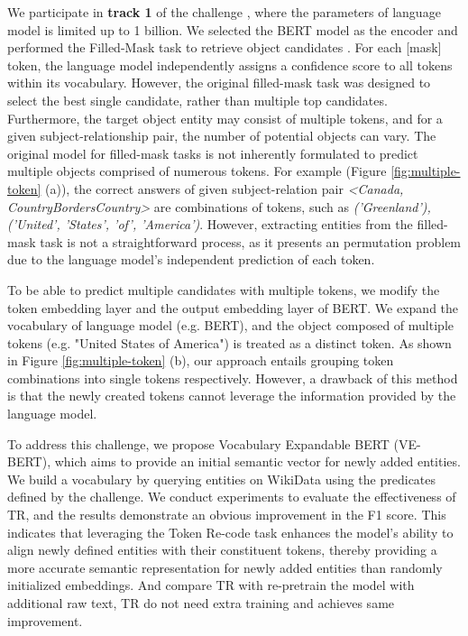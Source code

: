 \documentclass[]{ceurart}
\begin{document}
We participate in \textbf{track 1} of the challenge \cite{singhania_lm-kbc_2023}, where the parameters of language model is limited up to 1 billion.  We selected the BERT \cite{devlin_bert_2019} model as the encoder and performed the Filled-Mask task to retrieve object candidates \cite{li_task-specific_2022}. For each [mask] token, the language model independently assigns a confidence score to all tokens within its vocabulary. However, the original filled-mask task was designed to select the best single candidate, rather than multiple top candidates. Furthermore, the target object entity may consist of multiple tokens, and for a given subject-relationship pair, the number of potential objects can vary. The original model for filled-mask tasks is not inherently formulated to predict multiple objects comprised of numerous tokens. For example (Figure \ref{fig:multiple-token} (a)),  the correct answers of given subject-relation pair \textit{<Canada, CountryBordersCountry>} are combinations of tokens, such as \textit{('Greenland'), ('United', 'States', 'of', 'America')}. However, extracting entities from the filled-mask task is not a straightforward process, as it presents an permutation problem due to the language model's independent prediction of each token.

To be able to predict multiple candidates with multiple tokens, we modify the token embedding layer and the output embedding layer of BERT. We expand the vocabulary of language model (e.g. BERT), and the object composed of multiple tokens (e.g. "United States of America") is treated as a distinct token. As shown in Figure \ref{fig:multiple-token} (b), our approach entails grouping token combinations into single tokens respectively. However, a drawback of this method is that the newly created tokens cannot leverage the information provided by the language model. 



To address this challenge, we propose Vocabulary Expandable BERT (VE-BERT), which aims to provide an initial semantic vector for newly added entities. We build a vocabulary by querying entities on WikiData using the predicates defined by the challenge. We conduct experiments to evaluate the effectiveness of TR, and the results demonstrate an obvious improvement in the F1 score. This indicates that leveraging the Token Re-code task enhances the model's ability to align newly defined entities with their constituent tokens, thereby providing a more accurate semantic representation for newly added entities than randomly initialized embeddings. And compare TR with re-pretrain the model with additional raw text, TR do not need extra training and achieves same improvement.
\end{document}

